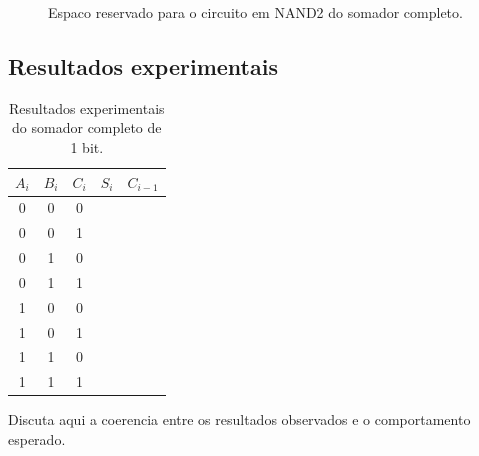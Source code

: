 \begin{figure}[H]
    \centering
    \fbox{\rule{0pt}{5cm}\rule{0.8\textwidth}{0pt}}
    \caption{Espaco reservado para o circuito em NAND2 do somador completo.}
\end{figure}

\subsection{Resultados experimentais}

\begin{table}[H]
    \centering
    \caption{Resultados experimentais do somador completo de 1 bit.}
    \begin{tabular}{ccccc}
        \toprule
        $A_i$ & $B_i$ & $C_i$ & $S_i$ & $C_{i-1}$ \\
        \midrule
        0 & 0 & 0 & & \\
        0 & 0 & 1 & & \\
        0 & 1 & 0 & & \\
        0 & 1 & 1 & & \\
        1 & 0 & 0 & & \\
        1 & 0 & 1 & & \\
        1 & 1 & 0 & & \\
        1 & 1 & 1 & & \\
        \bottomrule
    \end{tabular}
\end{table}

Discuta aqui a coerencia entre os resultados observados e o comportamento esperado.
